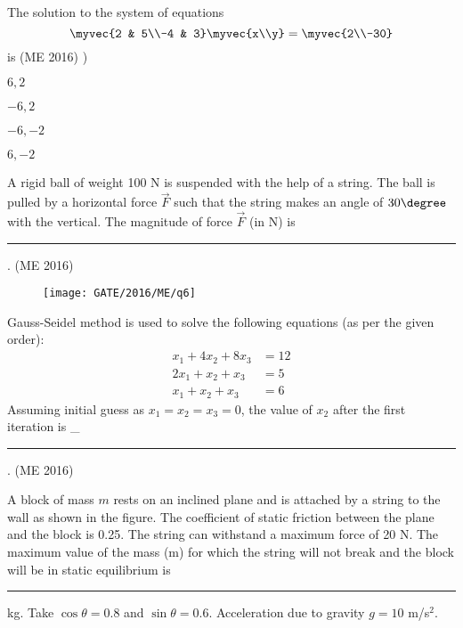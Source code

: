    \item The solution to the system of equations
          \[
              \myvec{2 & 5\\-4 & 3}\myvec{x\\y}=\myvec{2\\-30}
          \]
          is
	  \hfill(ME 2016)
	  )
          \begin{enumerate}
              \begin{multicols}{4}
                  \item $6, 2$
                  \item $-6, 2$
                  \item $-6, -2$
                  \item $6, -2$
              \end{multicols}
          \end{enumerate}
  \item A rigid ball of weight 100 N is suspended with the help of a string. The ball is pulled by a horizontal force $\vec{F}$ such that the string makes an angle of $30\degree$ with the vertical. The magnitude of force $\vec{F}$ (in N) is \rule{1cm}{0.01pt}.
	  \hfill(ME 2016)
          \begin{figure}[H]
              \centering
              \texttt{[image: GATE/2016/ME/q6]}
              \caption{}
              \label{q6}
          \end{figure}
    \item Gauss-Seidel method is used to solve the following equations (as per the given order):
          \begin{align}
              x_1 + 4x_2 + 8x_3 & = 12 \\
              2x_1 + x_2 + x_3  & = 5  \\
              x_1 + x_2 + x_3   & = 6
          \end{align}
          Assuming initial guess as $x_1 = x_2 = x_3 = 0$, the value of $x_2$ after the first iteration is _\rule{1cm}{0.01pt}.
	  \hfill(ME 2016)
    \item A block of mass $m$ rests on an inclined plane and is attached by a string to the wall as shown in the figure. The coefficient of static friction between the plane and the block is 0.25. The string can withstand a maximum force of 20 N. The maximum value of the mass (m) for which the string will not break and the block will be in static equilibrium is \rule{1cm}{0.01pt} kg.
          Take $\cos \theta = 0.8$ and $\sin \theta = 0.6$.
          Acceleration due to gravity $g = 10$ m/s$^2$.
